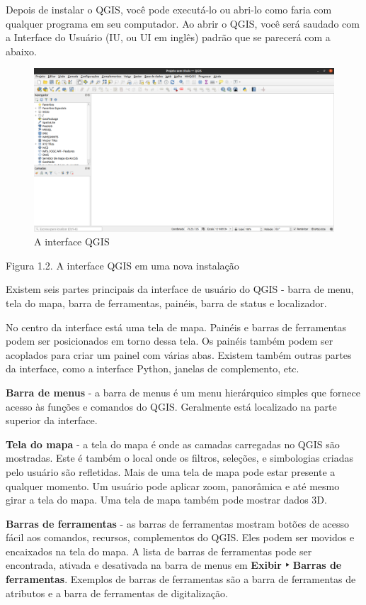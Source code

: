 \documentclass[
]{book}
\begin{document}
Depois de instalar o QGIS, você pode executá-lo ou abri-lo como faria com qualquer programa em seu computador. Ao abrir o QGIS, você será saudado com a Interface do Usuário (IU, ou UI em inglês) padrão que se parecerá com a abaixo.

\begin{figure}
\centering
\includegraphics{media/modulo1/qgis-interface.png}
\caption{A interface QGIS}
\end{figure}

Figura 1.2. A interface QGIS em uma nova instalação

Existem seis partes principais da interface de usuário do QGIS - barra de menu, tela do mapa, barra de ferramentas, painéis, barra de status e localizador.

No centro da interface está uma tela de mapa. Painéis e barras de ferramentas podem ser posicionados em torno dessa tela. Os painéis também podem ser acoplados para criar um painel com várias abas. Existem também outras partes da interface, como a interface Python, janelas de complemento, etc.

\textbf{Barra de menus} - a barra de menus é um menu hierárquico simples que fornece acesso às funções e comandos do QGIS. Geralmente está localizado na parte superior da interface.

\textbf{Tela do mapa} - a tela do mapa é onde as camadas carregadas no QGIS são mostradas. Este é também o local onde os filtros, seleções, e simbologias criadas pelo usuário são refletidas. Mais de uma tela de mapa pode estar presente a qualquer momento. Um usuário pode aplicar zoom, panorâmica e até mesmo girar a tela do mapa. Uma tela de mapa também pode mostrar dados 3D.

\textbf{Barras de ferramentas} - as barras de ferramentas mostram botões de acesso fácil aos comandos, recursos, complementos do QGIS. Eles podem ser movidos e encaixados na tela do mapa. A lista de barras de ferramentas pode ser encontrada, ativada e desativada na barra de menus em \textbf{Exibir ‣ Barras de ferramentas}. Exemplos de barras de ferramentas são a barra de ferramentas de atributos e a barra de ferramentas de digitalização.
\end{document}
